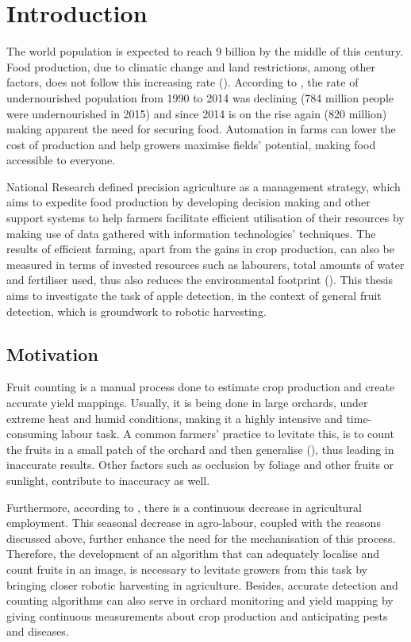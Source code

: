 \chapter{Introduction} \label{Chapter:Introduction}
The world population is expected to reach 9 billion by the middle of this century. Food production, due to climatic change and land restrictions, among other factors, does not follow this increasing rate (\cite{godfray2010food}). According to \cite{mcguire2015fao}, the rate of undernourished population from 1990 to 2014 was declining (784 million people were undernourished in 2015) and since 2014 is on the rise again (820 million) making apparent the need for securing food. Automation in farms can lower the cost of production and help growers maximise fields' potential, making food accessible to everyone.

National Research \cite{NAP5491} defined precision agriculture as a management strategy, which aims to expedite food production by developing decision making and other support systems to help farmers facilitate efficient utilisation of their resources by making use of data gathered with information technologies' techniques. The results of efficient farming, apart from the gains in crop production, can also be measured in terms of invested resources such as labourers, total amounts of water and fertiliser used, thus also reduces the environmental footprint (\cite{zhang2012application}). This thesis aims to investigate the task of apple detection, in the context of general fruit detection, which is groundwork to robotic harvesting.

\section{Motivation}
Fruit counting is a manual process done to estimate crop production and create accurate yield mappings. Usually, it is being done in large orchards, under extreme heat and humid conditions, making it a highly intensive and time-consuming labour task. A common farmers' practice to levitate this, is to count the fruits in a small patch of the orchard and then generalise (\cite{bargoti2017fruit}), thus leading in inaccurate results. Other factors such as occlusion by foliage and other fruits or sunlight, contribute to inaccuracy as well.

Furthermore, according to \cite{agro_employment}, there is a continuous decrease in agricultural employment. This seasonal decrease in agro-labour, coupled with the reasons discussed above, further enhance the need for the mechanisation of this process. Therefore, the development of an algorithm that can adequately localise and count fruits in an image, is necessary to levitate growers from this task by bringing closer robotic harvesting in agriculture. Besides, accurate detection and counting algorithms can also serve in orchard monitoring and yield mapping by giving continuous measurements about crop production and anticipating pests and diseases.

